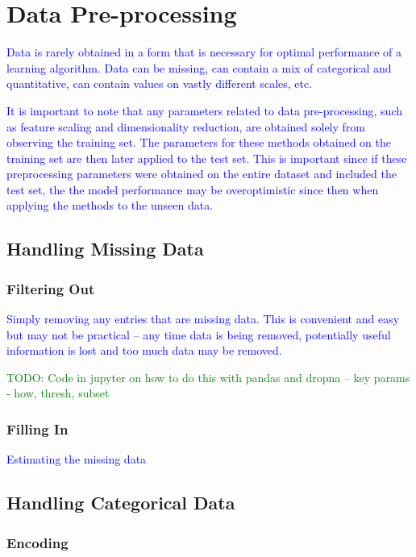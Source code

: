 \section{Data Pre-processing}

\textcolor{blue}{Data is rarely obtained in a form that is necessary for optimal performance of a learning algorithm. Data can be missing, can contain a mix of categorical and quantitative, can contain values on vastly different scales, etc.}

\textcolor{blue}{It is important to note that any parameters related to data pre-processing, such as feature scaling and dimensionality reduction, are obtained solely from observing the training set. The parameters for these methods obtained on the training set are then later applied to the test set. This is important since if these preprocessing parameters were obtained on the entire dataset and included the test set, the the model performance may be overoptimistic since then when applying the methods to the unseen data.}

\subsection{Handling Missing Data}

\subsubsection{Filtering Out}

\textcolor{blue}{Simply removing any entries that are missing data. This is convenient and easy but may not be practical -- any time data is being removed, potentially useful information is lost and too much data may be removed.}

\textcolor{green}{TODO: Code in jupyter on how to do this with pandas and dropna -- key params - how, thresh, subset}

\subsubsection{Filling In}

\textcolor{blue}{Estimating the missing data}

\subsection{Handling Categorical Data}

\subsubsection{Encoding}

